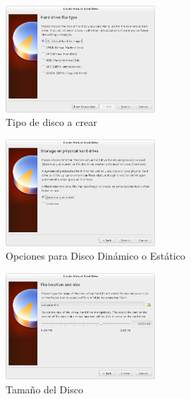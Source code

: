 \begin{enumerate}
\begin{itemize}
	
	
	\begin{figure}[H]
		\centering
		\includegraphics[width=0.5\textwidth]{aux/nododvi}
		\caption{Tipo de disco a crear}
	\end{figure}
	


	
	\begin{figure}[H]
		\centering
		\includegraphics[width=0.5\textwidth]{aux/hddinamico}
		\caption{Opciones para Disco Dinámico o Estático}
	\end{figure}
	



	\begin{figure}[H]
		\centering
		\includegraphics[width=0.5\textwidth]{aux/nodohdsize}
		\caption{Tamaño del Disco}
	\end{figure}
		

\end{itemize}


\end{enumerate}
